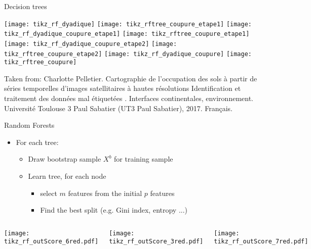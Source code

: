   \begin{frame}{Decision trees}
    \begin{center}
      {
        \texttt{[image: tikz\_rf\_dyadique]}
        \texttt{[image: tikz\_rftree\_coupure\_etape1]}
      }
      {
        \texttt{[image: tikz\_rf\_dyadique\_coupure\_etape1]}
        \texttt{[image: tikz\_rftree\_coupure\_etape1]}
      }
      {
        \texttt{[image: tikz\_rf\_dyadique\_coupure\_etape2]}
        \texttt{[image: tikz\_rftree\_coupure\_etape2]}
      }
      {
        \texttt{[image: tikz\_rf\_dyadique\_coupure]}
        \texttt{[image: tikz\_rftree\_coupure]}
      }
    \end{center}
    {\tiny Taken from: Charlotte Pelletier. Cartographie de l’occupation des sols à partir de séries temporelles d’images satellitaires à hautes résolutions Identification et traitement des données mal étiquetées . Interfaces continentales, environnement. Université Toulouse 3 Paul Sabatier (UT3 Paul Sabatier), 2017. Français.}
  \end{frame}

  \begin{frame}{Random Forests}
    \begin{itemize}
    \item For each tree:
      \begin{itemize}
      \item Draw bootstrap sample $X^b$ for training sample
      \item Learn tree, for each node
        \begin{itemize}
        \item select $m$ features from the initial $p$ features
        \item Find the best split (e.g. Gini index, entropy ...)
        \end{itemize}
      \end{itemize}
    \end{itemize}

    \begin{columns}
      \texttt{[image: tikz\_rf\_outScore\_6red.pdf]}

      \texttt{[image: tikz\_rf\_outScore\_3red.pdf]}

      \texttt{[image: tikz\_rf\_outScore\_7red.pdf]}
    \end{columns}
  \end{frame}

